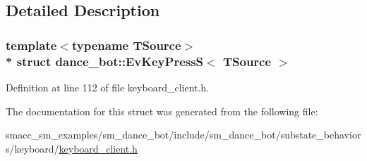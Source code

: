 \subsection{Detailed Description}
\subsubsection*{template$<$typename T\+Source$>$\\*
struct dance\+\_\+bot\+::\+Ev\+Key\+Press\+S$<$ T\+Source $>$}



Definition at line 112 of file keyboard\+\_\+client.\+h.



The documentation for this struct was generated from the following file\+:\begin{DoxyCompactItemize}
\item 
smacc\+\_\+sm\+\_\+examples/sm\+\_\+dance\+\_\+bot/include/sm\+\_\+dance\+\_\+bot/substate\+\_\+behaviors/keyboard/\hyperlink{keyboard__client_8h}{keyboard\+\_\+client.\+h}\end{DoxyCompactItemize}
